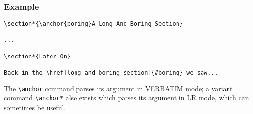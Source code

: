 \subsubsection*{Example}

\begin{verbatim}
\section*{\anchor{boring}A Long And Boring Section}

...

\section*{Later On}

Back in the \href[long and boring section]{#boring} we saw...
\end{verbatim}

The \verb|\anchor| command parses its argument in VERBATIM mode; a variant
command \verb|\anchor*| also exists which parses its argument in LR mode,
which can sometimes be useful.
